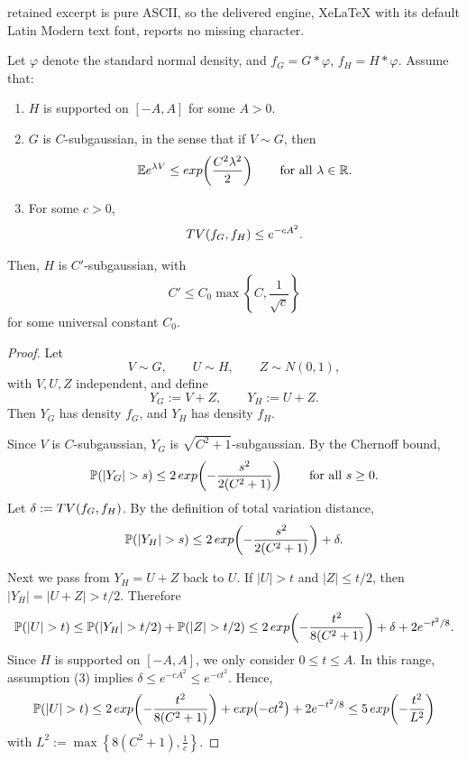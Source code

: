 \documentclass[10pt,a4paper]{amsart}
\def\exp{\mathop{\rm exp}}
\newcommand{\TV}{{\rm TV}}
\begin{document}
retained excerpt is pure ASCII, so the delivered engine, XeLaTeX with its default Latin Modern text font, reports no missing character.
\begin{lemma}
\label{lem:tv-subgaussian-transfer}
Let $\varphi$ denote the standard normal density, and $
f_G = G * \varphi$, $f_H = H * \varphi$.
Assume that:
\begin{enumerate}
    \item $H$ is supported on $[-A,A]$ for some $A>0$.
    \item $G$ is $C$-subgaussian, in the sense that if $V \sim G$, then
    \[
    \mathbb E e^{\lambda V}
    \le
    \exp\!\left(\frac{C^2\lambda^2}{2}\right)
    \qquad
    \text{for all } \lambda \in \mathbb R.
    \]
    \item For some $c>0$,
    \[
    \TV(f_G,f_H)\le e^{-cA^2}.
    \]
\end{enumerate}
Then,
$H$ is $C'$-subgaussian, with
\[
C' \le C_0 \max\!\left\{C,\frac{1}{\sqrt c}\right\}
\]
for some universal constant $C_0$.
\end{lemma}

\begin{proof}
Let
\[
V \sim G,
\qquad
U \sim H,
\qquad
Z \sim N(0,1),
\]
with $V,U,Z$ independent, and define
\[
Y_G := V+Z,
\qquad
Y_H := U+Z.
\]
Then $Y_G$ has density $f_G$, and $Y_H$ has density $f_H$.

Since $V$ is $C$-subgaussian,
$Y_G$ is $\sqrt{C^2+1}$-subgaussian. By the Chernoff bound,
\[
\mathbb P(|Y_G|>s)
\le
2\exp\!\left(-\frac{s^2}{2(C^2+1)}\right)
\qquad
\text{for all } s\ge 0.
\]
Let $\delta := \TV(f_G,f_H)$. By the definition of total variation distance,
\[
\mathbb P(|Y_H|>s)
\le
2\exp\!\left(-\frac{s^2}{2(C^2+1)}\right)+\delta.
\]

Next we pass from $Y_H=U+Z$ back to $U$. If $|U|>t$ and $|Z|\le t/2$, then $
|Y_H| = |U+Z| > t/2$. Therefore
\[
\mathbb P(|U|>t)
\le
\mathbb P(|Y_H|>t/2)+\mathbb P(|Z|>t/2)
\le
2\exp\!\left(-\frac{t^2}{8(C^2+1)}\right)
+
\delta
+
2e^{-t^2/8}.
\]
Since $H$ is supported on $[-A,A]$, we only consider $0\le t\le A$. In this range, assumption (3) implies
$\delta
\le
e^{-cA^2}
\le
e^{-ct^2}$.
Hence,
\[
\mathbb P(|U|>t)
\le
2\exp\!\left(-\frac{t^2}{8(C^2+1)}\right)
+
\exp\!\left(-ct^2\right)
+
2e^{-t^2/8}
\leq 5\exp\!\left(-\frac{t^2}{L^2}\right)
\]
with $L^2 := \max\!\left\{8(C^2+1), \frac{1}{c}\right\}$.
\end{proof}
\end{document}
